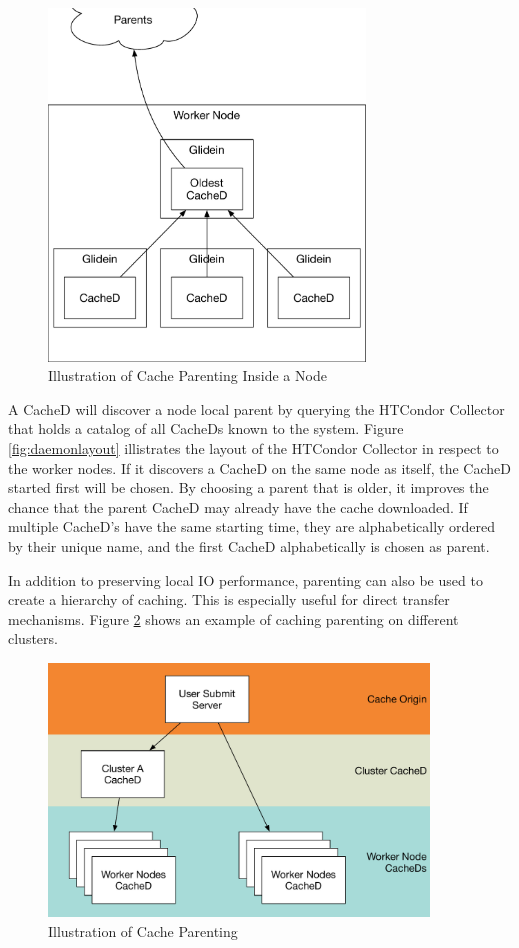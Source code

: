 \begin{figure}[ht]
	\centering
	\includegraphics[width=0.75\textwidth]{images/ParentingInsideNode.pdf}
	\caption{Illustration of Cache Parenting Inside a Node}
	\label{fig:cacheparentingnode}
\end{figure}

A CacheD will discover a node local parent by querying the HTCondor Collector that holds a catalog of all CacheDs known to the system.  Figure \ref{fig:daemonlayout} illistrates the layout of the HTCondor Collector in respect to the worker nodes.  If it discovers a CacheD on the same node as itself, the CacheD started first will be chosen.  By choosing a parent that is older, it improves the chance that the parent CacheD may already have the cache downloaded.  If multiple CacheD's have the same starting time, they are alphabetically ordered by their unique name, and the first CacheD alphabetically is chosen as parent.

In addition to preserving local IO performance, parenting can also be used to create a hierarchy of caching.  This is especially useful for direct transfer mechanisms.  Figure \ref{fig:cacheparenting} shows an example of caching parenting on different clusters.

\begin{figure}[ht]
\centering
\includegraphics[width=0.9\textwidth]{images/CacheDParenting.pdf}
\caption{Illustration of Cache Parenting}
\label{fig:cacheparenting}
\end{figure}

